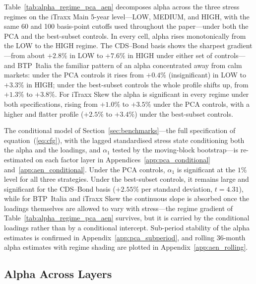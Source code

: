 Table~\ref{tab:alpha_regime_pca_aen} decomposes alpha across the three
stress regimes on the iTraxx Main 5-year level---LOW, MEDIUM, and
HIGH, with the same 60 and 100 basis-point cutoffs used throughout the
paper---under both the PCA and the best-subset controls. In every
cell, alpha rises monotonically from the LOW to the HIGH regime. The
CDS--Bond basis shows the sharpest gradient---from about $+2.8\%$ in
LOW to $+7.6\%$ in HIGH under either set of controls---and BTP~Italia the
familiar pattern of an alpha concentrated away from calm markets:
under the PCA controls it rises from $+0.4\%$ (insignificant) in LOW
to $+3.3\%$ in HIGH; under the best-subset controls the whole
profile shifts up, from $+1.3\%$ to $+3.8\%$. For iTraxx Skew
the alpha is significant in every regime under both specifications,
rising from $+1.0\%$ to $+3.5\%$ under the PCA controls, with a
higher and flatter profile ($+2.5\%$ to $+3.4\%$) under the
best-subset controls.

The \citet{christopherson1998conditioning} conditional model of
Section~\ref{sec:benchmarks}---the full specification of
equation~(\ref{eq:cfg}), with the lagged standardised stress state
conditioning both the alpha and the loadings, and $\alpha_1$ tested by
the moving-block bootstrap---is re-estimated on each factor layer in
Appendices~\ref{app:pca_conditional} and~\ref{app:aen_conditional}.
Under the PCA controls, $\alpha_1$ is significant at the $1\%$ level
for all three strategies. Under the best-subset controls, it remains
large and significant for the CDS--Bond basis ($+2.55\%$ per standard
deviation, $t = 4.31$), while for BTP~Italia and iTraxx Skew the
continuous slope is absorbed once the loadings themselves are allowed
to vary with stress---the regime gradient of
Table~\ref{tab:alpha_regime_pca_aen} survives, but it is carried by
the conditional loadings rather than by a conditional intercept.
Sub-period stability of the alpha estimates is confirmed in
Appendix~\ref{app:pca_subperiod}, and rolling 36-month alpha estimates
with regime shading are plotted in Appendix~\ref{app:aen_rolling}.



\subsection{Alpha Across Layers}
\label{sec:factor_discussion}

